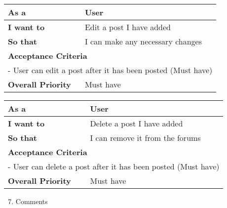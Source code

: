 \begin{table}[H]
    \begin{tabular}{|ll|}
    \hline
    \multicolumn{1}{|l|}{\textbf{As a}}             & User                             \\ \hline
    \multicolumn{1}{|l|}{\textbf{I want to}}        & Edit a post I have added         \\ \hline
    \multicolumn{1}{|l|}{\textbf{So that}}          & I can make any necessary changes \\ \hline
    \multicolumn{2}{|l|}{\textbf{Acceptance Criteria}}                                 \\ \hline
    \multicolumn{2}{|l|}{- User can edit a post after it has been posted (Must have)}  \\ \hline
    \multicolumn{1}{|l|}{\textbf{Overall Priority}} & Must have                        \\ \hline
    \end{tabular}
\end{table}

\begin{table}[H]
    \begin{tabular}{|ll|}
    \hline
    \multicolumn{1}{|l|}{\textbf{As a}}              & User                             \\ \hline
    \multicolumn{1}{|l|}{\textbf{I want to}}         & Delete a post I have added       \\ \hline
    \multicolumn{1}{|l|}{\textbf{So that}}           & I can remove it from the forums  \\ \hline
    \multicolumn{2}{|l|}{\textbf{Acceptance Criteria}}                                  \\ \hline
    \multicolumn{2}{|l|}{- User can delete a post after it has been posted (Must have)} \\ \hline
    \multicolumn{1}{|l|}{\textbf{Overall Priority}}  & Must have                        \\ \hline
    \end{tabular}
\end{table}

\begin{enumerate}
    \setcounter{enumi}{6}
    \item Comments
\end{enumerate}

